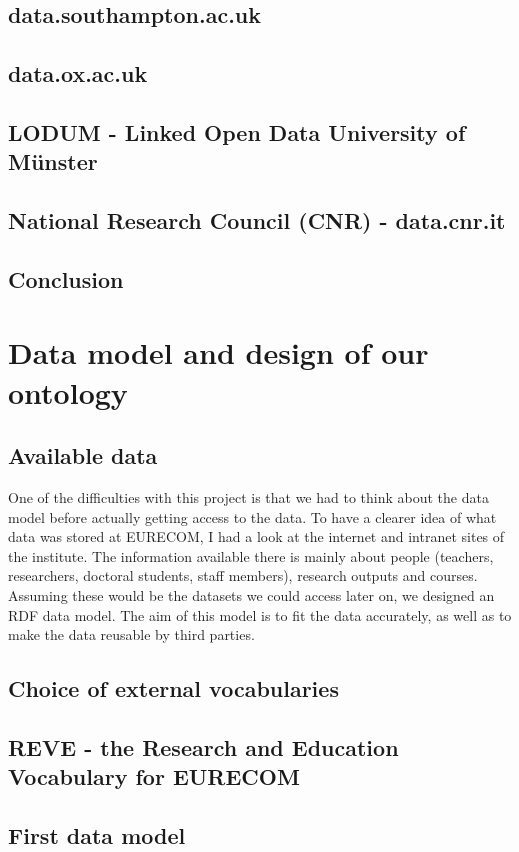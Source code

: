 \documentclass[a4paper,11pt]{report}
\begin{document}
\section*{data.southampton.ac.uk}
\section*{data.ox.ac.uk}
\section*{LODUM - Linked Open Data University of Münster}
\section*{National Research Council (CNR) - data.cnr.it}
\section*{Conclusion}



\chapter{Data model and design of our ontology}
\section{Available data}
One of the difficulties with this project is that we had to think about the data model before actually getting access to the data. To have a clearer idea of what data was stored at EURECOM, I had a look at the internet and intranet sites of the institute. The information available there is mainly about people (teachers, researchers, doctoral students, staff members), research outputs and courses. Assuming these would be the datasets we could access later on, we designed an RDF data model. The aim of this model is to fit the data accurately, as well as to make the data reusable by third parties. 
\section{Choice of external vocabularies}
\section{REVE - the Research and Education Vocabulary for EURECOM}
\section{First data model}
\end{document}
